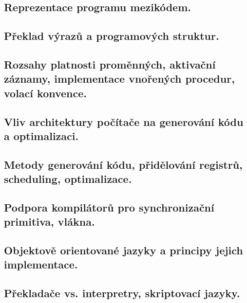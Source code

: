 \subsection{Reprezentace programu mezikódem.}
\subsection{Překlad výrazů a programových struktur.}
\subsection{Rozsahy platnosti proměnných, aktivační záznamy, implementace vnořených procedur, volací konvence.}
\subsection{Vliv architektury počítače na generování kódu a optimalizaci.}
\subsection{Metody generování kódu, přidělování registrů, scheduling, optimalizace.}
\subsection{Podpora kompilátorů pro synchronizační primitiva, vlákna.}
\subsection{Objektově orientované jazyky a principy jejich implementace.}
\subsection{Překladače vs. interpretry, skriptovací jazyky.}
